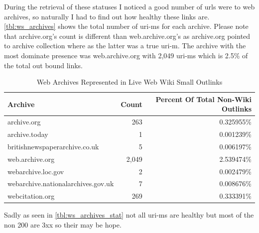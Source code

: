 \documentclass[11pt]{article}
\begin{document}
During the retrieval of these statuses I noticed a good number of urls were to web archives, so naturally I had to find out how healthy these links are. \autoref{tbl:ws_archives} shows the total number of uri-ms for each archive. Please note that archive.org's count is different than web.archive.org's as archive.org pointed to archive collection where as the latter was a true uri-m. The archive with the most dominate presence was web.archive.org with 2,049 uri-ms which is 2.5\% of the total out bound links.
\begin{table}[H]
	\caption{Web Archives Represented in Live Web Wiki Small Outlinks}
	\label{tbl:ws_archives}
	\centering
\begin{tabular}{lrr}
	\hline
	Archive                            & Count & Percent Of Total Non-Wiki Outlinks \\
	\hline
	archive.org                        &     263 & 0.325955\%                   \\
 archive.today                      &       1 & 0.001239\%                   \\
 britishnewspaperarchive.co.uk      &       5 & 0.006197\%                   \\
 web.archive.org                    &    2,049 & 2.539474\%                   \\
 webarchive.loc.gov                 &       2 & 0.002479\%                   \\
 webarchive.nationalarchives.gov.uk &       7 & 0.008676\%                   \\
 webcitation.org                    &     269 & 0.333391\%                   \\
	\hline
\end{tabular}
\end{table}
Sadly as seen in \autoref{tbl:ws_archives_stat} not all uri-ms are healthy but most of the non 200 are 3xx so their may be hope.
\end{document}
